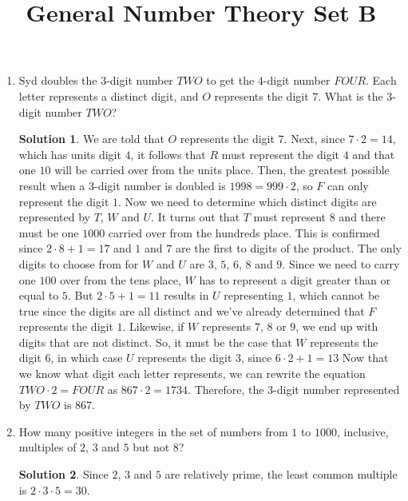 \documentclass{article}
\title{General Number Theory Set B}
\date{}
\author{}
\theoremstyle{definition}
\newtheorem*{solution}{Solution}
\begin{document}
\maketitle
\begin{multicols}{2}
    \begin{enumerate}
        \item Syd doubles the $3$-digit number $TWO$ to get the $4$-digit number $FOUR$.
        Each letter represents a distinct digit, and $O$ represents the digit $7$.
        What is the $3$-digit number $TWO$?
        \begin{solution}
            We are told that $O$ represents the digit $7$.
            Next, since $7 \cdot 2 = 14$, which has units digit $4$,
            it follows that $R$ must represent the digit $4$ and that one $10$ will be carried over from the units place.
            Then, the greatest possible result when a $3$-digit number is doubled is $1998 = 999 \cdot 2$, so $F$ can only represent the digit $1$.
            Now we need to determine which distinct digits are represented by $T$, $W$ and $U$.
            It turns out that $T$ must represent $8$ and there must be one $1000$ carried over from the hundreds place.
            This is confirmed since $2 \cdot 8 + 1 =17$ and $1$ and $7$ are the first to digits of the product.
            The only digits to choose from for $W$ and $U$ are $3$, $5$, $6$, $8$ and $9$.
            Since we need to carry one $100$ over from the tens place, $W$ has to represent a digit greater than or equal to $5$.
            But $2 \cdot 5 +1 = 11$ results in $U$ representing $1$,
            which cannot be true since the digits are all distinct and we've already determined that $F$ represents the digit $1$.
            Likewise, if $W$ represents $7$, $8$ or $9$, we end up with digits that are not distinct.
            So, it must be the case that $W$ represents the digit $6$, in which case $U$ represents the digit $3$, since $6 \cdot 2 +1 = 13$
            Now that we know what digit each letter represents, we can rewrite the equation $TWO \cdot 2 = FOUR$ as $867 \cdot 2 = 1734$.
            Therefore, the $3$-digit number represented by $TWO$ is $867$.
        \end{solution}
        \item How many positive integers in the set of numbers from $1$ to $1000$, inclusive, multiples of $2$, $3$ and $5$ but not $8$?
        \begin{solution}
            Since $2$, $3$ and $5$ are relatively prime, the least common multiple is $2 \cdot 3 \cdot 5 = 30$.

\end{solution}
\end{enumerate}
\end{multicols}
\end{document}
